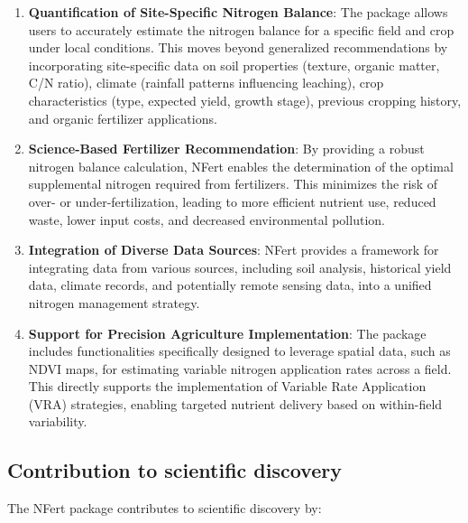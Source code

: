 \documentclass[
  11pt,
]{article}
\begin{document}
\begin{enumerate}
\def\labelenumi{\arabic{enumi}.}
\item
  \textbf{Quantification of Site-Specific Nitrogen Balance}: The package
  allows users to accurately estimate the nitrogen balance for a
  specific field and crop under local conditions. This moves beyond
  generalized recommendations by incorporating site-specific data on
  soil properties (texture, organic matter, C/N ratio), climate
  (rainfall patterns influencing leaching), crop characteristics (type,
  expected yield, growth stage), previous cropping history, and organic
  fertilizer applications.
\item
  \textbf{Science-Based Fertilizer Recommendation}: By providing a
  robust nitrogen balance calculation, NFert enables the determination
  of the optimal supplemental nitrogen required from fertilizers. This
  minimizes the risk of over- or under-fertilization, leading to more
  efficient nutrient use, reduced waste, lower input costs, and
  decreased environmental pollution.
\item
  \textbf{Integration of Diverse Data Sources}: NFert provides a
  framework for integrating data from various sources, including soil
  analysis, historical yield data, climate records, and potentially
  remote sensing data, into a unified nitrogen management strategy.
\item
  \textbf{Support for Precision Agriculture Implementation}: The package
  includes functionalities specifically designed to leverage spatial
  data, such as NDVI maps, for estimating variable nitrogen application
  rates across a field. This directly supports the implementation of
  Variable Rate Application (VRA) strategies, enabling targeted nutrient
  delivery based on within-field variability.
\end{enumerate}

\subsection{Contribution to scientific
discovery}\label{contribution-to-scientific-discovery}

The NFert package contributes to scientific discovery by:
\end{document}
